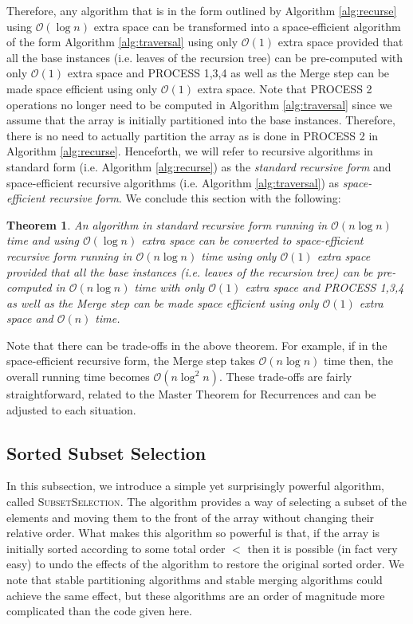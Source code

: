 \documentclass{elsart}
\newcommand{\Oh}[1]{\ensuremath{\mathcal{O}(#1)}}
\newtheorem{theorem}{Theorem}
\begin{document}
{Therefore, any algorithm that is in the form outlined by Algorithm
\ref{alg:recurse} using $\Oh{\log n}$ extra space can be transformed
into a space-efficient algorithm of the form Algorithm \ref{alg:traversal}
using only $\Oh{1}$ extra space provided that all the base instances
(i.e. leaves of the recursion tree) can be pre-computed with only \Oh{1} extra
space and PROCESS 1,3,4 as well as the Merge step can be made
space efficient using only \Oh{1} extra space. Note that PROCESS 2
operations no longer need to be computed in Algorithm \ref{alg:traversal}
since we assume that the array is initially partitioned into the
base instances. Therefore, there is no need to actually partition
the array as is done in PROCESS 2 in Algorithm \ref{alg:recurse}. Henceforth, we will refer
to recursive algorithms in standard form (i.e. Algorithm
\ref{alg:recurse}) as the {\em standard recursive form} and
space-efficient recursive algorithms (i.e. Algorithm \ref{alg:traversal})
as {\em space-efficient recursive form}. We conclude this section
with the following:



\begin{theorem}
An algorithm in standard recursive form running in \Oh{n \log n} time and using \Oh{\log n} extra space can be converted
to space-efficient recursive form running in \Oh{n \log n} time using only \Oh{1} extra space provided that all the base instances
(i.e. leaves of the recursion tree) can be pre-computed in \Oh{n \log n} time with only \Oh{1} extra
space and PROCESS 1,3,4 as well as the Merge step can be made
space efficient using only \Oh{1} extra space and \Oh{n} time.
\end{theorem}

Note that there can be trade-offs in the above theorem. For example, if in the space-efficient recursive form, the Merge step takes
\Oh{n \log n} time then, the overall running time becomes \Oh{n \log^2 n}. These trade-offs are fairly straightforward, related to the
Master Theorem for Recurrences \cite{cormen:alg} and can be adjusted to each situation.

}


\subsection{Sorted Subset Selection}

In this subsection, we introduce a simple yet surprisingly powerful
algorithm, called \textsc{SubsetSelection}.
The algorithm provides a way of selecting a subset of the elements and
moving them to the front of the array without changing their relative
order.  What makes this algorithm so powerful is that, if the array is
initially sorted according to some total order $<$ then it is possible
(in fact very easy) to undo the effects of the algorithm to restore
the original sorted order.  We note that stable partitioning
algorithms and stable merging algorithms could achieve the same
effect, but these algorithms are an order of magnitude more
complicated than the code given here.
\end{document}
